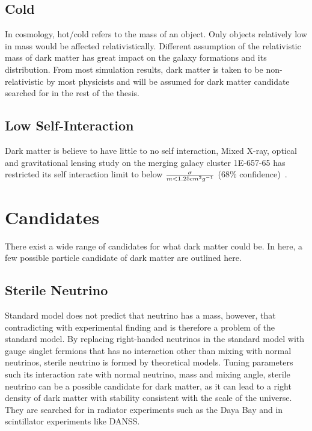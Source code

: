 \subsection{Cold}
In cosmology, hot/cold refers to the mass of an object. Only objects relatively low in mass would be affected relativistically. Different assumption of the relativistic mass of dark matter has great impact on the galaxy formations and its distribution. From most simulation results, dark matter is taken to be non-relativistic by most physicists and will be assumed for dark matter candidate searched for in the rest of the thesis. 

\subsection{Low Self-Interaction}
Dark matter is believe to have little to no self interaction, Mixed X-ray, optical and gravitational lensing study on the merging galacy cluster 1E-657-65 has restricted its self interaction limit to below $\sigma \over m < 1.25 cm^{2} g^{-1}$ (68\% confidence)~\cite{randall2008constraints}. 
 

\section{Candidates}
\label{section:candidates}

There exist a wide range of candidates for what dark matter could be. In here, a few possible particle candidate of dark matter are outlined here. 

\subsection{Sterile Neutrino}
Standard model does not predict that neutrino has a mass, however, that contradicting with experimental finding and is therefore a problem of the standard model. By replacing right-handed neutrinos in the standard model with gauge singlet fermions that has no interaction other than mixing with normal neutrinos, sterile neutrino is formed by theoretical models. Tuning parameters such its interaction rate with normal neutrino, mass and mixing angle, sterile neutrino can be a possible candidate for dark matter, as it can lead to a right
density of dark matter with stability consistent with the scale of the universe. ~\cite{dodelson1994sterile} They are searched for in radiator experiments such as the Daya Bay \cite{an2014search, wong2017search} and in scintillator experiments like DANSS. ~\cite{alekseev2018search}

